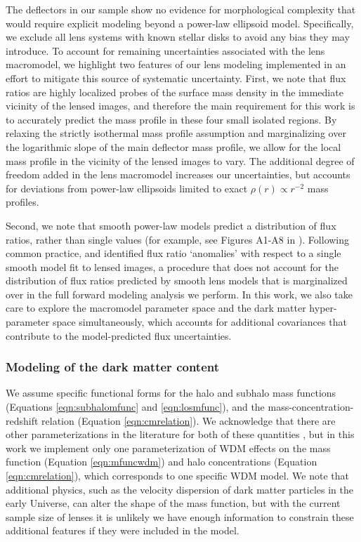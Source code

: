 The deflectors in our sample show no evidence for morphological complexity that would require explicit modeling beyond a power-law ellipsoid model. Specifically, we exclude all lens systems with known stellar disks to avoid any bias they may introduce. To account for remaining uncertainties associated with the lens macromodel, we highlight two features of our lens modeling implemented in an effort to mitigate this source of systematic uncertainty. First, we note that flux ratios are highly localized probes of the surface mass density in the immediate vicinity of the lensed images, and therefore the main requirement for this work is to accurately predict the mass profile in these four small isolated regions. By relaxing the strictly isothermal mass profile assumption and marginalizing over the logarithmic slope of the main deflector mass profile, we allow for the local mass profile in the vicinity of the lensed images to vary. The additional degree of freedom added in the lens macromodel increases our uncertainties, but accounts for deviations from power-law ellipsoids limited to exact $\rho \left(r\right) \propto r^{-2}$ mass profiles. 

Second, we note that smooth power-law models predict a distribution of flux ratios, rather than single values (for example, see Figures A1-A8 in \cite{Nierenberg++19}). Following common practice, \cite{Gilman++17} and \cite{Hsueh++18} identified flux ratio `anomalies' with respect to a single smooth model fit to lensed images, a procedure that does not account for the distribution of flux ratios predicted by smooth lens models that is marginalized over in the full forward modeling analysis we perform. In this work, we also take care to explore the macromodel parameter space and the dark matter hyper-parameter space simultaneously, which accounts for additional covariances that contribute to the model-predicted flux uncertainties. 

\subsubsection{Modeling of the dark matter content}
We assume specific functional forms for the halo and subhalo mass functions (Equations \ref{eqn:subhalomfunc} and \ref{eqn:losmfunc}), and the mass-concentration-redshift relation (Equation \ref{eqn:cmrelation}). We acknowledge that there are other parameterizations in the literature for both of these quantities \cite[e.g.][]{Schneider++12,Benson++13}, but in this work we implement only one parameterization of WDM effects on the mass function (Equation \ref{eqn:mfuncwdm}) and halo concentrations (Equation  \ref{eqn:cmrelation}), which corresponds to one specific WDM model. We note that additional physics, such as the velocity dispersion of dark matter particles in the early Universe, can alter the shape of the mass function, but with the current sample size of lenses it is unlikely we have enough information to constrain these additional features if they were included in the model. 

